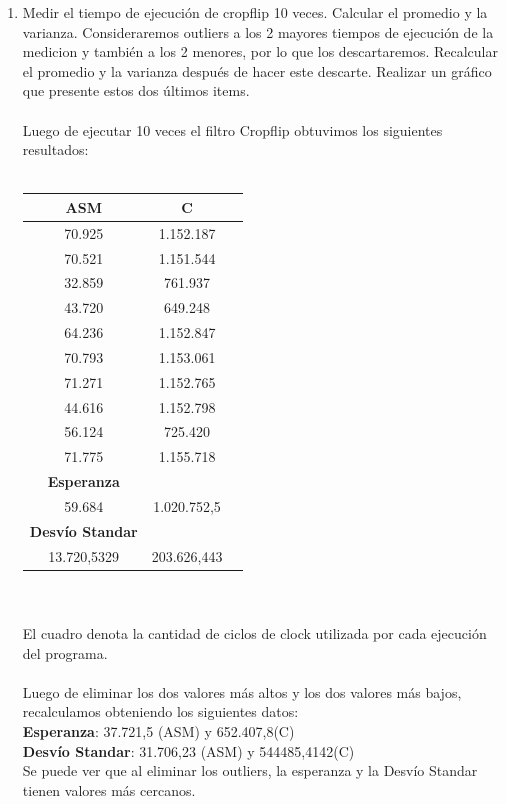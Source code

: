 \begin{enumerate}
    \item Medir el tiempo de ejecución de cropflip 10 veces. Calcular el promedio y la varianza. Consideraremos outliers a los 2 mayores tiempos de ejecución de la medicion y también a los 2 menores, por lo que los descartaremos. Recalcular el promedio y la varianza después de hacer este descarte. Realizar un gráfico que presente estos dos últimos items.\\
\\
Luego de ejecutar 10 veces el filtro Cropflip obtuvimos los siguientes resultados: \\
\\
    	\begin{tabular}[c]{|c|c|c|}
	\hline
		\textbf{ASM} & \textbf{C}\\
		\hline
70.925 &	1.152.187\\
		\hline
70.521 &	1.151.544\\
		\hline
32.859 &	761.937\\
		\hline
43.720 &	649.248\\
		\hline
64.236 &	1.152.847\\
		\hline
70.793 &	1.153.061\\
		\hline
71.271 &	1.152.765\\
		\hline
44.616 &	1.152.798\\
		\hline
56.124 &	725.420\\
		\hline
71.775 &	1.155.718\\
		\hline
	\textbf{Esperanza}	\\
		\hline
59.684 & 1.020.752,5	\\
		\hline
		\textbf{Desvío Standar}	\\
		\hline
13.720,5329 & 203.626,443	\\
		\hline
	\end{tabular}\\\\
	El cuadro denota la cantidad de ciclos de clock utilizada por cada ejecuci\'on del programa. \\
	\\
	Luego de eliminar los dos valores m\'as altos y los dos valores m\'as bajos, recalculamos obteniendo los siguientes datos: \\
	\textbf{Esperanza}: 37.721,5 (ASM) y 652.407,8(C)\\
	\textbf{Desvío Standar}:	31.706,23 (ASM) y 544485,4142(C)\\
	Se puede ver que al eliminar los outliers, la esperanza y la Desvío Standar tienen valores m\'as cercanos. \\

\end{enumerate}
